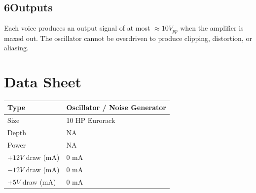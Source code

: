 \documentclass[12pt,letter]{article}
\begin{document}
\subsection*{6{\quad}Outputs}

Each voice produces an output signal of at most ${\approx}10V_{pp}$ when the
amplifier is maxed out. The oscillator cannot be overdriven to produce
clipping, distortion, or aliasing.


\clearpage
\section*{Data Sheet}

\begin{table}[!htp]
\begin{tabular}{|l|l|}
\hline
Type             & Oscillator / Noise Generator  \\
\hline
Size             & 10 HP Eurorack           \\
\hline
Depth            & NA                       \\
\hline
Power            & NA                       \\ %
\hline
$+12V$ draw (mA) & 0 mA                     \\
\hline
$-12V$ draw (mA) & 0 mA                     \\
\hline
$+5V$ draw (mA)  & 0 mA                     \\
\hline
\end{tabular}
\end{table}


\clearpage
\renewcommand\refname{References \& Acknowledgments}
\nocite{*}


\end{document}
